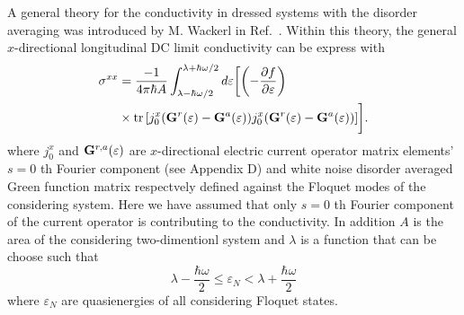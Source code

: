 A general theory for the conductivity in dressed systems with the disorder averaging was introduced by M. Wackerl in Ref.~\cite{wackerl20,wackerlthesis20}. Within this theory, the general $x$-directional longitudinal DC limit conductivity can be express with
\begin{equation} \label{eq_21}
  \begin{aligned}
    {\sigma}^{xx} &=
    \frac{-1}{4\pi\hbar A}
    \int_{\lambda-\hbar\omega/2}^{\lambda+ \hbar\omega/2} d\varepsilon \bigg[
    \qty(
    -\frac{\partial f}{\partial \varepsilon})
    \\
    & \times
    \tr
    \qty[
    {j}^x_0
    \qty(
    \vb{G}^{r} (\varepsilon) - \vb{G}^{a} (\varepsilon)
    )
    {j}^x_0
    \qty(
    \vb{G}^{r} (\varepsilon) - \vb{G}^{a} (\varepsilon)
    )
    ]\bigg].
  \end{aligned}
\end{equation}
where ${j}^x_0$ and $\vb{G}^{r,a} (\varepsilon)$ are $x$-directional electric current operator matrix elements' $s=0$ th Fourier component (see Appendix D) and white noise disorder averaged Green function matrix \cite{wackerl20,wackerlthesis20} respectvely defined against the Floquet modes of the considering system. Here we have assumed that only $s=0$ th Fourier component of the current operator is contributing to the conductivity. In addition $A$ is the area of the considering two-dimentionl system and $\lambda$ is a function that can be choose such that
\begin{equation} \label{eq_22}
    \lambda - \frac{\hbar \omega}{2}
    \leq \varepsilon_N
    <
    \lambda + \frac{\hbar \omega}{2}
\end{equation}
where $ \varepsilon_N$ are quasienergies of all considering Floquet states.

